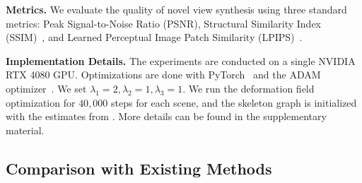 \par 
\vspace{6pt}
\noindent\textbf{Metrics.} 
We evaluate the quality of novel view synthesis using three standard metrics: Peak Signal-to-Noise Ratio (PSNR), Structural Similarity Index (SSIM)~\cite{wang2004image}, and Learned Perceptual Image Patch Similarity (LPIPS)~\cite{zhang2018unreasonable}.

\par 
\vspace{6pt}
\noindent\textbf{Implementation Details.} The experiments are conducted on a single NVIDIA RTX 4080 GPU. Optimizations are done with PyTorch~\cite{Ansel_PyTorch_2_Faster_2024} and the ADAM optimizer~\cite{kingma2015adam}. We set $\lambda_1 = 2, \lambda_2 = 1, \lambda_3 = 1$. We run the deformation field optimization for $40{,}000$ steps for each scene, and the skeleton graph is initialized with the estimates from \cite{yao2025riggs}.
More details can be found in the supplementary material. 



\subsection{Comparison with Existing Methods}
\label{dyn_sec:exp_main}


\begin{table}[t!]
\vspace{-5pt}
\centering
\caption{Quantitative results on the D-NeRF dataset~\cite{pumarola2021d} downsampled at 0.1 intervals, yielding 11 frames per motion sequence. We report the average metrics across all test cases / the mean over the worst-performing test case of each scene. $^\dagger$ indicates method initialized with the same skeleton input as ours.}
\label{dyn_table:dnerf_0.1}
\end{table}

